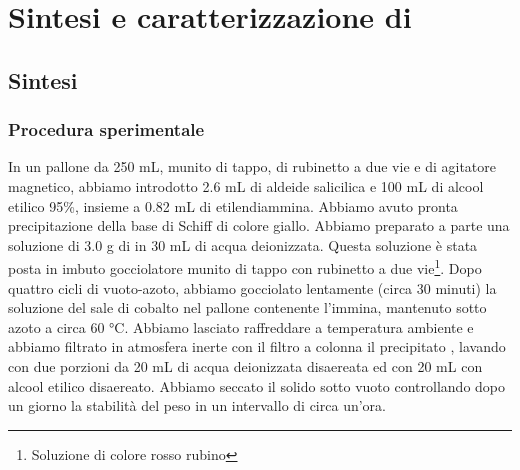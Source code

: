 \section{Sintesi e caratterizzazione di }
\subsection{Sintesi}
\subsubsection{Procedura sperimentale}
In un pallone da 250 mL, munito di tappo, di rubinetto a due vie e di agitatore magnetico, abbiamo introdotto 2.6 mL  di aldeide salicilica e 100 mL di alcool etilico 95\%, insieme a 0.82 mL  di etilendiammina. Abbiamo avuto pronta precipitazione della base di Schiff di colore giallo. Abbiamo preparato a parte una soluzione di 3.0 g  di  in 30 mL di acqua deionizzata. Questa soluzione è stata posta in imbuto gocciolatore munito di tappo con rubinetto a due vie\footnote{Soluzione di colore rosso rubino}. Dopo quattro cicli di vuoto-azoto, abbiamo gocciolato lentamente (circa 30 minuti) la soluzione del sale di cobalto nel pallone contenente l'immina, mantenuto  sotto azoto a circa 60 °C. Abbiamo lasciato raffreddare a temperatura ambiente e abbiamo filtrato in atmosfera inerte con il filtro a colonna il precipitato , lavando con due porzioni da 20 mL  di acqua deionizzata disaereata ed con 20 mL con alcool etilico disaereato. Abbiamo seccato il solido sotto vuoto controllando dopo un giorno la stabilità del peso in un intervallo di circa un'ora. 
